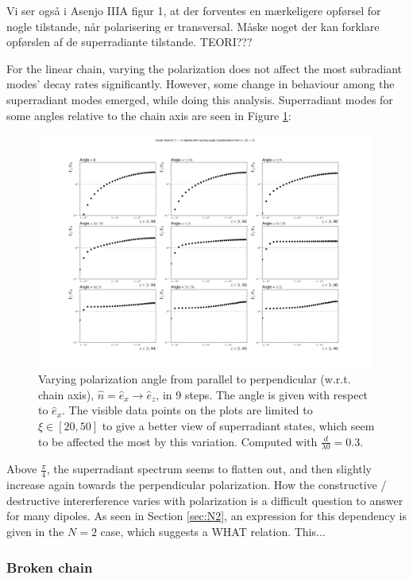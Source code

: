 \documentclass{article}
\begin{document}
Vi ser også i Asenjo IIIA figur 1, at der forventes en mærkeligere opførsel for nogle tilstande, når polarisering er transversal. Måske noget der kan forklare opførslen af de superradiante tilstande. TEORI???

For the linear chain, varying the polarization does not affect the most subradiant modes' decay rates significantly. However, some change in behaviour among the superradiant modes emerged, while doing this analysis. Superradiant modes for some angles relative to the chain axis are seen in Figure \ref{fig:linear_var_angle}:
\begin{figure}[H]
    \includegraphics[width=0.99\textwidth]{figs/case_linear_var_angle_0_pi05.png}
    \caption{Varying polarization angle from parallel to perpendicular (w.r.t. chain axis), $\hat{n} = \hat{e}_x \rightarrow \hat{e}_z$, in 9 steps. The angle is given with respect to $\hat{e}_x$. The visible data points on the plots are limited to $\xi \in [20, 50]$ to give a better view of superradiant states, which seem to be affected the most by this variation. Computed with $\frac{d}{\lambda0} = 0.3$. }
    \label{fig:linear_var_angle}
\end{figure}
Above $\frac{\pi}{4}$, the superradiant spectrum seems to flatten out, and then slightly increase again towards the perpendicular polarization. How the constructive / destructive intererference varies with polarization is a difficult question to answer for many dipoles. As seen in Section \ref{sec:N2}, an expression for this dependency is given in the $N=2$ case, which suggests a WHAT relation. This...

\subsubsection{Broken chain}\label{disc:linear_broken}
\end{document}
